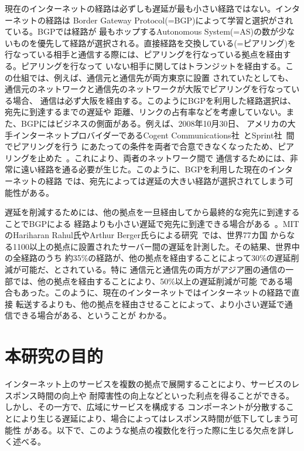 現在のインターネットの経路は必ずしも遅延が最も小さい経路ではない。インターネットの経路は
Border Gateway Protocol(=BGP)によって学習と選択がされている。BGPでは経路が
最もホップするAutonomous System(=AS)の数が少ないものを優先して経路が選択される。直接経路を交換している(=ピアリング)を
行なっている相手と通信する際には、ピアリングを行なっている拠点を経由する。ピアリングを行なって
いない相手に関してはトランジットを経由する。この仕組では、例えば、通信元と通信先が両方東京に設置
されていたとしても、通信元のネットワークと通信先のネットワークが大阪でピアリングを行なっている場合、
通信は必ず大阪を経由する。このようにBGPを利用した経路選択は、宛先に到達するまでの遅延や
距離、リンクの占有率などを考慮していない。また、BGPにはビジネスの側面がある。例えば、2008年10月30日、
アメリカの大手インターネットプロバイダーであるCogent Communications社~\cite{cogent}とSprint社~\cite{sprint}間でピアリングを行う
にあたっての条件を両者で合意できなくなったため、ピアリングを止めた~\cite{cogentpeering}。これにより、両者のネットワーク間で
通信するためには、非常に遠い経路を通る必要が生じた。このように、BGPを利用した現在のインターネットの経路
では、宛先によっては遅延の大きい経路が選択されてしまう可能性がある。

遅延を削減するためには、他の拠点を一旦経由してから最終的な宛先に到達することでBGPによる
経路よりも小さい遅延で宛先に到達できる場合がある~\cite{netvirt}。MITのHariharan Rahul氏やArthur Berger氏らによる研究~\cite{mittech}では、世界77カ国
からなる1100以上の拠点に設置されたサーバー間の遅延を計測した。その結果、世界中の全経路のうち
約35\%の経路が、他の拠点を経由することによって30\%の遅延削減が可能だ、とされている。特に
通信元と通信先の両方がアジア圏の通信の一部では、他の拠点を経由することにより、50\%以上の遅延削減が可能
である場合もあった。このように、現在のインターネットではインターネットの経路で直接
転送するよりも、他の拠点を経由させることによって、より小さい遅延で通信できる場合がある、ということが
わかる。

\section{本研究の目的}
\label{background:ml3}

インターネット上のサービスを複数の拠点で展開することにより、サービスのレスポンス時間の向上や
耐障害性の向上などといった利点を得ることができる。しかし、その一方で、広域にサービスを構成する
コンポーネントが分散することにより生じる遅延により、場合によってはレスポンス時間が低下してしまう可能性
がある。以下で、このような拠点の複数化を行った際に生じる欠点を詳しく述べる。

